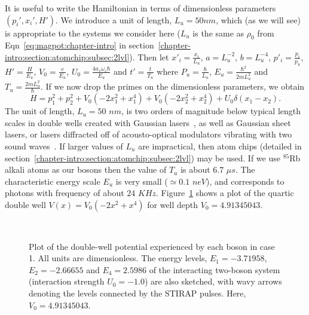It is useful to write the Hamiltonian in terms of dimensionless parameters $(p_i', x_i',H')$. We  introduce a unit of length, $L_u=50 nm$, which (as we will see) is appropriate to the systems we consider here ($L_u$ is the same as $\rho_0$ from Eqn~\ref{eq:magpot:chapter-intro} in section~\ref{chapter-intro:section:atomchip:subsec:2lvl}).  Then let  $x'_i=\frac{x_i}{L_u}$, $a=L_u^{-2}$, $b=L_u^{-4}$, $p'_i=\frac{p_i}{p_u}$, $H'=\frac{H}{E_u}$,  $V_0=\frac{v}{E_u}$, $U_0=\frac{4a_s \omega_s \hbar}{E_u}$ and $t'=\frac{t}{T_u}$ where $P_u=\frac{\hbar}{L_u}$, $E_u=\frac{\hbar^2}{2mL^2_u}$ and $T_u=\frac{2mL^2_u}{\hbar}$. If we now drop the primes on the dimensionless parameters, we obtain
%
\begin{equation}
H =p^2_1+p^2_2+V_0 (-2 x_1^2+ x_1^4) +V_0 (-2 x_2^2+ x_2^4)+U_0 \delta(x_1-x_2) .
\label{eq:hamscale}
\end{equation}
%
The unit of length, $L_u = 50$ $nm$, is two orders of magnitude below typical length scales in double wells created with  Gaussian lasers~\cite{dudarev:entanglement}, as well as Gaussian sheet lasers, or  lasers diffracted off of acousto-optical modulators vibrating with two sound waves~\cite{ketterle:aom}. If larger values of $L_u$ are impractical, then atom chips (detailed in section~\ref{chapter-intro:section:atomchip:subsec:2lvl}) may be used. If we use $^{85}$Rb alkali atoms as our bosons then the value of $T_u$ is about $6.7$ $\mu s$. The characteristic energy scale $E_u$ is very small ($\simeq 0.1$ $neV$), and corresponds to photons with frequency of about $24$ $KHz$. Figure~\ref{fig:doublewell} shows a plot of the quartic double well $V(x)=V_0 (-2 x^2+ x^4)$ for  well depth $V_0=4.91345043$.
\begin{figure} 
\ 
\caption{Plot of the double-well potential experienced by each boson in case 1. All units are dimensionless. The energy levels, $E_1=-3.71958$, $E_2=-2.66655$ and $E_4=2.5986$  of the interacting two-boson system (interaction strength  $U_0=-1.0$) are also sketched, with wavy arrows denoting the levels connected by the STIRAP pulses.  Here, $V_0=4.91345043$.}
\label{fig:doublewell}
\end{figure}


